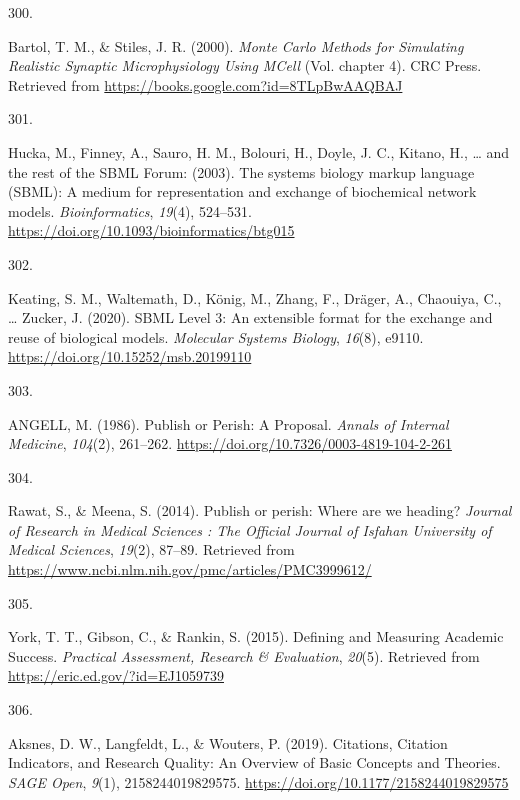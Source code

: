 \documentclass[
  11pt,
  letterpaper,
]{scrreprt}
\newlength{\cslhangindent}
\newlength{\csllabelwidth}
\newenvironment{CSLReferences}[2] %
 {\begin{list}{}{%
  \setlength{\itemindent}{0pt}
  \setlength{\leftmargin}{0pt}
  \setlength{\parsep}{0pt}
  \ifodd #1
   \setlength{\leftmargin}{\cslhangindent}
   \setlength{\itemindent}{-1\cslhangindent}
  \fi
  \setlength{\itemsep}{#2\baselineskip}}}
 {\end{list}}
\newcommand{\CSLLeftMargin}[1]{\parbox[t]{\csllabelwidth}{\strut#1\strut}}
\newcommand{\CSLRightInline}[1]{\parbox[t]{\linewidth - \csllabelwidth}{\strut#1\strut}}
\begin{document}
\begin{CSLReferences}{0}{0}
\CSLLeftMargin{300. }%
\CSLRightInline{Bartol, T. M., \& Stiles, J. R. (2000). \emph{Monte
{Carlo Methods} for {Simulating Realistic Synaptic Microphysiology Using
MCell}} (Vol. chapter 4). CRC Press. Retrieved from
\url{https://books.google.com?id=8TLpBwAAQBAJ}}

\CSLLeftMargin{301. }%
\CSLRightInline{Hucka, M., Finney, A., Sauro, H. M., Bolouri, H., Doyle,
J. C., Kitano, H., \ldots{} and the rest of the SBML Forum: (2003). The
systems biology markup language ({SBML}): A medium for representation
and exchange of biochemical network models. \emph{Bioinformatics},
\emph{19}(4), 524--531.
\url{https://doi.org/10.1093/bioinformatics/btg015}}

\CSLLeftMargin{302. }%
\CSLRightInline{Keating, S. M., Waltemath, D., König, M., Zhang, F.,
Dräger, A., Chaouiya, C., \ldots{} Zucker, J. (2020). {SBML Level} 3: An
extensible format for the exchange and reuse of biological models.
\emph{Molecular Systems Biology}, \emph{16}(8), e9110.
\url{https://doi.org/10.15252/msb.20199110}}

\CSLLeftMargin{303. }%
\CSLRightInline{ANGELL, M. (1986). Publish or {Perish}: {A Proposal}.
\emph{Annals of Internal Medicine}, \emph{104}(2), 261--262.
\url{https://doi.org/10.7326/0003-4819-104-2-261}}

\CSLLeftMargin{304. }%
\CSLRightInline{Rawat, S., \& Meena, S. (2014). Publish or perish:
{Where} are we heading? \emph{Journal of Research in Medical Sciences :
The Official Journal of Isfahan University of Medical Sciences},
\emph{19}(2), 87--89. Retrieved from
\url{https://www.ncbi.nlm.nih.gov/pmc/articles/PMC3999612/}}

\CSLLeftMargin{305. }%
\CSLRightInline{York, T. T., Gibson, C., \& Rankin, S. (2015). Defining
and {Measuring Academic Success}. \emph{Practical Assessment, Research
\& Evaluation}, \emph{20}(5). Retrieved from
\url{https://eric.ed.gov/?id=EJ1059739}}

\CSLLeftMargin{306. }%
\CSLRightInline{Aksnes, D. W., Langfeldt, L., \& Wouters, P. (2019).
Citations, {Citation Indicators}, and {Research Quality}: {An Overview}
of {Basic Concepts} and {Theories}. \emph{SAGE Open}, \emph{9}(1),
2158244019829575. \url{https://doi.org/10.1177/2158244019829575}}


\end{CSLReferences}
\end{document}
